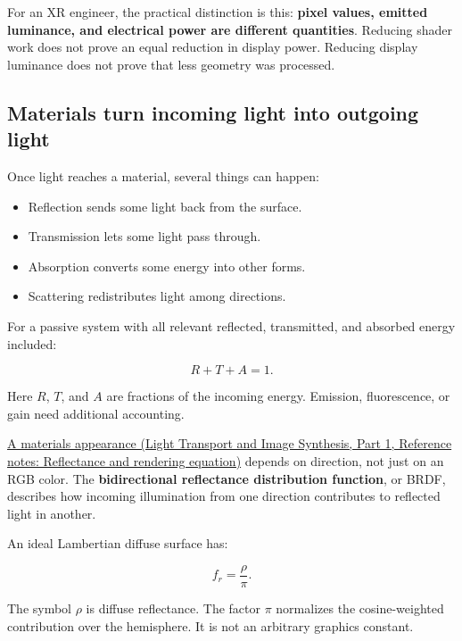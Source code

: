 For an XR engineer, the practical distinction is this: \textbf{pixel values, emitted luminance, and electrical power are different quantities}. Reducing shader work does not prove an equal reduction in display power. Reducing display luminance does not prove that less geometry was processed.

\subsection{Materials turn incoming light into outgoing light}\label{04-visual-computing-ii-ch042-materials-turn-incoming-light-into-outgoing-light}

\hypertarget{04-visual-computing-ii-ch042-materials-turn-incoming-light-into-outgoing-light}{}

Once light reaches a material, several things can happen:

\begin{itemize}
\tightlist
\item
  Reflection sends some light back from the surface.
\item
  Transmission lets some light pass through.
\item
  Absorption converts some energy into other forms.
\item
  Scattering redistributes light among directions.
\end{itemize}

For a passive system with all relevant reflected, transmitted, and absorbed energy included:

\[
R+T+A=1.
\]

Here \(R\), \(T\), and \(A\) are fractions of the incoming energy. Emission, fluorescence, or gain need additional accounting.

\href{../04-Light-Transport-and-Image-Synthesis-P01/main.pdf\#nameddest=appendix-96da0b153b77}{A material\textquotesingle s appearance (Light Transport and Image Synthesis, Part 1, Reference notes: Reflectance and rendering equation)} depends on direction, not just on an RGB color. The \textbf{bidirectional reflectance distribution function}, or BRDF, describes how incoming illumination from one direction contributes to reflected light in another.

An ideal Lambertian diffuse surface has:

\[
f_r=\frac{\rho}{\pi}.
\]

The symbol \(\rho\) is diffuse reflectance. The factor \(\pi\) normalizes the cosine-weighted contribution over the hemisphere. It is not an arbitrary graphics constant.

